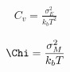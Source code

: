 \begin{appendices}
%

\begin{align}
  C_v = \frac{\sigma_E^2}{k_b T^2}
\end{align}

\begin{align}
  \Chi = \frac{\sigma_M^2}{k_b T}
\end{align}

%
%
%


\end{appendices}
